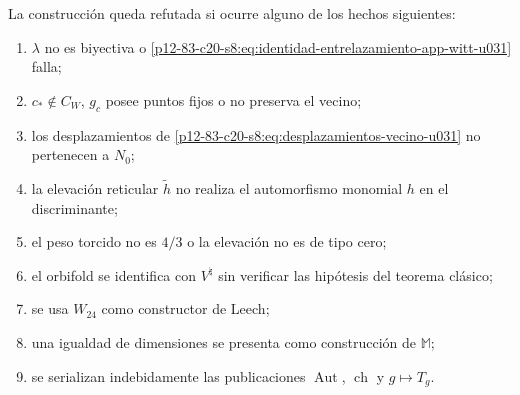 \begin{criterion}
\label{p12-83-c20-s8:crit:refutacion-corredor-lunar-u031}
La construcción queda refutada si ocurre alguno de los hechos siguientes:
\begin{enumerate}
 \item \(\lambda\) no es biyectiva o
       \eqref{p12-83-c20-s8:eq:identidad-entrelazamiento-app-witt-u031} falla;
 \item \(c_*\notin C_W\), \(g_c\) posee puntos fijos o no preserva el
       vecino;
 \item los desplazamientos de
       \eqref{p12-83-c20-s8:eq:desplazamientos-vecino-u031} no pertenecen a \(N_0\);
 \item la elevación reticular \(\widetilde h\) no realiza el automorfismo
       monomial \(h\) en el discriminante;
 \item el peso torcido no es \(4/3\) o la elevación no es de tipo cero;
 \item el orbifold se identifica con \(V^\natural\) sin verificar las
       hipótesis del teorema clásico;
 \item se usa \(W_{24}\) como constructor de Leech;
 \item una igualdad de dimensiones se presenta como construcción de
       \(\mathbb M\);
 \item se serializan indebidamente las publicaciones
       \(\operatorname{Aut}\), \(\operatorname{ch}\) y \(g\mapsto T_g\).
\end{enumerate}
\end{criterion}
